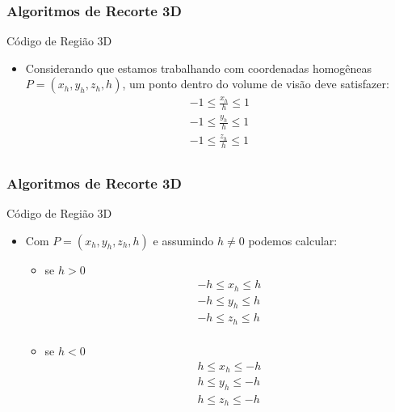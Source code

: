 \documentclass{beamer}
\begin{document}
\begin{frame}
\frametitle{Algoritmos de Recorte 3D}
	\begin{block}{Código de Região 3D}
		\begin{itemize}
			\item Considerando que estamos trabalhando com coordenadas homogêneas $P=(x_h,y_h,z_h,h)$, um ponto dentro do volume de visão deve satisfazer:
			\begin{eqnarray*}
				-1 \leq \frac{x_h}{h} \leq 1 \\
				-1 \leq \frac{y_h}{h} \leq 1 \\
				-1 \leq \frac{z_h}{h} \leq 1 \\
			\end{eqnarray*}
		\end{itemize}	
	\end{block}
\end{frame}

\begin{frame}
\frametitle{Algoritmos de Recorte 3D}
	\begin{block}{Código de Região 3D}
		\begin{itemize}
			\item Com $P=(x_h,y_h,z_h,h)$ e assumindo $h \neq 0$ podemos calcular:
			\begin{itemize}
				\item se $h > 0$
					\begin{eqnarray*}
					-h \leq x_h \leq h \\
					-h \leq y_h \leq h \\
					-h \leq z_h \leq h \\
					\end{eqnarray*}
				\item se $h < 0$
					\begin{eqnarray*}
						h \leq x_h \leq -h \\
						h \leq y_h \leq -h \\
						h \leq z_h \leq -h \\
					\end{eqnarray*}
			\end{itemize}
			
		\end{itemize}	
	\end{block}
\end{frame}
\end{document}
